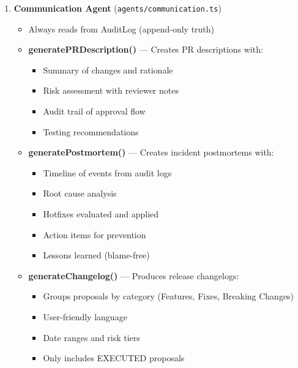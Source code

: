\documentclass[11pt,a4paper]{article}
\begin{document}
\begin{enumerate}
    \item \textbf{Communication Agent} (\texttt{agents/communication.ts})
    \begin{itemize}
        \item Always reads from AuditLog (append-only truth)
        \item \textbf{generatePRDescription()} --- Creates PR descriptions with:
        \begin{itemize}
            \item Summary of changes and rationale
            \item Risk assessment with reviewer notes
            \item Audit trail of approval flow
            \item Testing recommendations
        \end{itemize}
        \item \textbf{generatePostmortem()} --- Creates incident postmortems with:
        \begin{itemize}
            \item Timeline of events from audit logs
            \item Root cause analysis
            \item Hotfixes evaluated and applied
            \item Action items for prevention
            \item Lessons learned (blame-free)
        \end{itemize}
        \item \textbf{generateChangelog()} --- Produces release changelogs:
        \begin{itemize}
            \item Groups proposals by category (Features, Fixes, Breaking Changes)
            \item User-friendly language
            \item Date ranges and risk tiers
            \item Only includes EXECUTED proposals
        \end{itemize}
    \end{itemize}
\end{enumerate}
\end{document}
